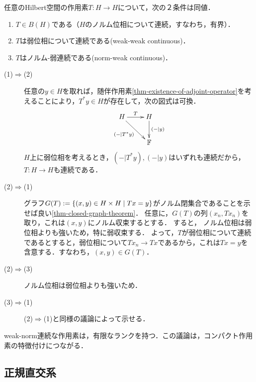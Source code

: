 \documentclass[uplatex,dvipdfmx]{jsreport}
\begin{document}
\begin{lemma}\label{lemma-characterization-of-bounded-operator-on-Hilbert-space}
    任意のHilbert空間の作用素$T:H\to H$について，次の２条件は同値．
    \begin{enumerate}
        \item $T\in B(H)$である（$H$のノルム位相について連続，すなわち，有界）．
        \item $T$は弱位相について連続である(weak-weak continuous)．
        \item $T$はノルム-弱連続である(norm-weak continuous)．
    \end{enumerate}
\end{lemma}
\begin{Proof}\mbox{}
    \begin{description}
        \item[(1)$\Rightarrow$(2)] 任意の$y\in H$を取れば，随伴作用素\ref{thm-existence-of-adjoint-operator}を考えることにより，$T^*y\in H$が存在して，次の図式は可換．
        \[\xymatrix{
            H\ar[r]^-T\ar[dr]_-{(-|T^*y)}&H\ar[d]^-{(-|y)}\\
            &\bF
        }\]
        $H$上に弱位相を考えるとき，$(-|T^*y),(-|y)$はいずれも連続だから，$T:H\to H$も連続である．
        \item[(2)$\Rightarrow$(1)] 
        グラフ$G(T):=\left\{(x,y)\in H\times H\mid Tx=y\right\}$がノルム閉集合であることを示せば良い\ref{thm-closed-graph-theorem}．
        任意に，$G(T)$の列$(x_n,Tx_n)$を取り，これは$(x,y)$にノルム収束するとする．
        すると，
        ノルム位相は弱位相よりも強いため，特に弱収束する．
        よって，$T$が弱位相について連続であるとすると，弱位相について$Tx_n\to Tx$であるから，これは$Tx=y$を含意する．すなわち，$(x,y)\in G(T)$．
        \item[(2)$\Rightarrow$(3)] ノルム位相は弱位相よりも強いため．
        \item[(3)$\Rightarrow$(1)] (2)$\Rightarrow$(1)と同様の議論によって示せる．
    \end{description}
\end{Proof}

\begin{remarks}
    weak-norm連続な作用素は，有限なランクを持つ．この議論は，コンパクト作用素の特徴付けにつながる．
\end{remarks}

\subsection{正規直交系}
\end{document}
